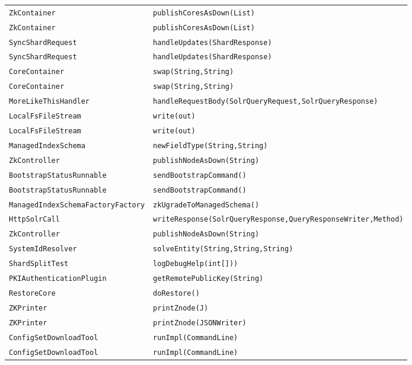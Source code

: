 \begin{center}
\begin{longtable}{ll}
\lstinline/ZkContainer/&{\lstinline/publishCoresAsDown(List)/}\\
\lstinline/ZkContainer/&{\lstinline/publishCoresAsDown(List)/}\\
\lstinline/SyncShardRequest/&{\lstinline/handleUpdates(ShardResponse)/}\\
\lstinline/SyncShardRequest/&{\lstinline/handleUpdates(ShardResponse)/}\\
\lstinline/CoreContainer/&{\lstinline/swap(String,String)/}\\
\lstinline/CoreContainer/&{\lstinline/swap(String,String)/}\\
\lstinline/MoreLikeThisHandler/&{\lstinline/handleRequestBody(SolrQueryRequest,SolrQueryResponse)/}\\
\lstinline/LocalFsFileStream/&{\lstinline/write(out)/}\\
\lstinline/LocalFsFileStream/&{\lstinline/write(out)/}\\
\lstinline/ManagedIndexSchema/&{\lstinline/newFieldType(String,String)/}\\
\lstinline/ZkController/&{\lstinline/publishNodeAsDown(String)/}\\
\lstinline/BootstrapStatusRunnable/&{\lstinline/sendBootstrapCommand()/}\\
\lstinline/BootstrapStatusRunnable/&{\lstinline/sendBootstrapCommand()/}\\
\lstinline/ManagedIndexSchemaFactoryFactory/&{\lstinline/zkUgradeToManagedSchema()/}\\
\lstinline/HttpSolrCall/&{\lstinline/writeResponse(SolrQueryResponse,QueryResponseWriter,Method)/}\\
\lstinline/ZkController/&{\lstinline/publishNodeAsDown(String)/}\\
\lstinline/SystemIdResolver/&{\lstinline/solveEntity(String,String,String)/}\\
\lstinline/ShardSplitTest/&{\lstinline/logDebugHelp(int[]))/}\\
\lstinline/PKIAuthenticationPlugin/&{\lstinline/getRemotePublicKey(String)/}\\
\lstinline/RestoreCore/&{\lstinline/doRestore()/}\\
\lstinline/ZKPrinter/&{\lstinline/printZnode(J)/}\\
\lstinline/ZKPrinter/&{\lstinline/printZnode(JSONWriter)/}\\
\lstinline/ConfigSetDownloadTool/&{\lstinline/runImpl(CommandLine)/}\\
\lstinline/ConfigSetDownloadTool/&{\lstinline/runImpl(CommandLine)/}\\

\end{longtable}
\end{center}
